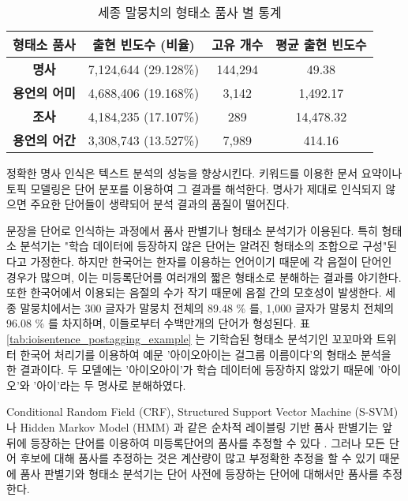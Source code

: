 \documentclass[oneside, ko,phd]{snuthesis_utf8_kor}
\begin{document}
\begin{table}[ht]
  \centering
  \caption{세종 말뭉치의 형태소 품사 별 통계}
  \label{tab:pos_statistics}
\begin{tabular}{|>{}c |c|c|c|}
\hline
\textbf{형태소 품사}  & \textbf{출현 빈도수 (비율)} & \textbf{고유 개수} & \textbf{평균 출현 빈도수} \\ \hline
\textbf{명사} & 7,124,644 (29.128\%) & 144,294 & 49.38 \\ \hline
\textbf{용언의 어미} & 4,688,406 (19.168\%) & 3,142 & 1,492.17  \\ \hline
\textbf{조사} & 4,184,235 (17.107\%) & 289  & 14,478.32 \\ \hline
\textbf{용언의 어간} & 3,308,743 (13.527\%) & 7,989 & 414.16  \\ \hline
\end{tabular}
\end{table}

정확한 명사 인식은 텍스트 분석의 성능을 향상시킨다.
키워드를 이용한 문서 요약이나 토픽 모델링은 단어 분포를 이용하여 그 결과를 해석한다.
명사가 제대로 인식되지 않으면 주요한 단어들이 생략되어 분석 결과의 품질이 떨어진다.

문장을 단어로 인식하는 과정에서 품사 판별기나 형태소 분석기가 이용된다.
특히 형태소 분석기는 "학습 데이터에 등장하지 않은 단어는 알려진 형태소의 조합으로 구성"된다고 가정한다.
하지만 한국어는 한자를 이용하는 언어이기 때문에 각 음절이 단어인 경우가 많으며, 이는 미등록단어를 여러개의 짧은 형태소로 분해하는 결과를 야기한다.
또한 한국어에서 이용되는 음절의 수가 작기 때문에 음절 간의 모호성이 발생한다.
세종 말뭉치에서는 300 글자가 말뭉치 전체의 89.48 \% 를, 1,000 글자가 말뭉치 전체의 96.08 \% 를 차지하며, 이들로부터 수백만개의 단어가 형성된다.
표 \ref{tab:ioisentence_postagging_example} 는 기학습된 형태소 분석기인 꼬꼬마와 트위터 한국어 처리기를 이용하여 예문 '아이오아이는 걸그룹 이름이다'의 형태소 분석을 한 결과이다.
두 모델에는 '아이오아이'가 학습 데이터에 등장하지 않았기 때문에 '아이오'와 '아이'라는 두 명사로 분해하였다.

Conditional Random Field (CRF), Structured Support Vector Machine (S-SVM) 나 Hidden Markov Model (HMM) 과 같은 순차적 레이블링 기반 품사 판별기는 앞 뒤에 등장하는 단어를 이용하여 미등록단어의 품사를 추정할 수 있다 \cite{shim2004high, shim2007made, na2012crfs, lee2013joint}.
그러나 모든 단어 후보에 대해 품사를 추정하는 것은 계산량이 많고 부정확한 추정을 할 수 있기 때문에 품사 판별기와 형태소 분석기는 단어 사전에 등장하는 단어에 대해서만 품사를 추정한다.
\end{document}
